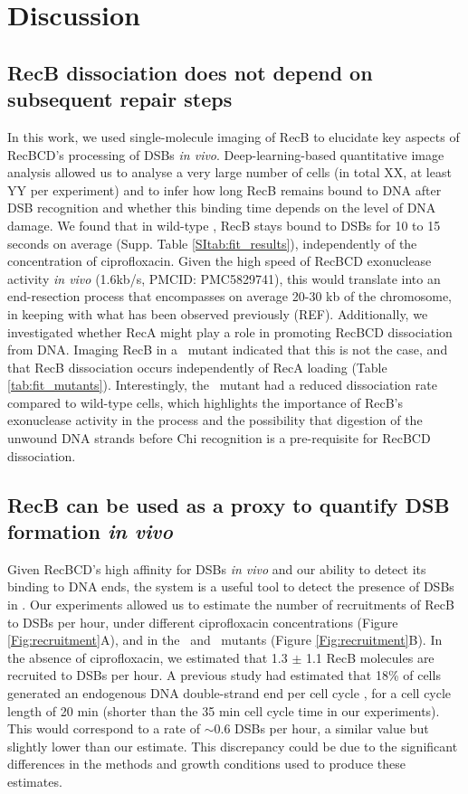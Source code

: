 \section*{Discussion}

\subsection*{RecB dissociation does not depend on subsequent repair steps}
In this work, we used single-molecule imaging of RecB to elucidate key aspects of RecBCD's processing of DSBs \emph{in vivo}. Deep-learning-based quantitative image analysis allowed us to analyse a very large number of cells (in total XX,  at least YY per experiment) and to infer how long RecB remains bound to DNA after DSB recognition and whether this binding time depends on the level of DNA damage. We found that in wild-type \ecoli, RecB stays bound to DSBs for 10 to 15 seconds on average (Supp. Table \ref{SItab:fit_results}), independently of the concentration of ciprofloxacin. Given the high speed of RecBCD exonuclease activity \emph{in vivo} (1.6kb/s, PMCID: PMC5829741), this would translate into an end-resection process that encompasses on average 20-30 kb of the chromosome, in keeping with what has been observed previously (REF). Additionally, we investigated whether RecA might play a role in promoting RecBCD dissociation from DNA. Imaging RecB in a \dreca\ mutant indicated that this is not the case, and that RecB dissociation occurs independently of RecA loading (Table \ref{tab:fit_mutants}). Interestingly, the \geneteneighty\ mutant had a reduced dissociation rate compared to wild-type cells, which highlights the importance of RecB's exonuclease activity in the process and the possibility that digestion of the unwound DNA strands before Chi recognition is a pre-requisite for RecBCD dissociation.

\subsection*{RecB can be used as a proxy to quantify DSB formation \emph{in vivo}}
Given RecBCD's high affinity for DSBs \emph{in vivo} and our ability to detect its binding to DNA ends, the system is a useful tool to detect the presence of DSBs in \ecoli. Our experiments allowed us to estimate the number of recruitments of RecB to DSBs per hour, under different ciprofloxacin concentrations (Figure \ref{Fig:recruitment}A), and in the \dreca\ and \geneteneighty\ mutants (Figure \ref{Fig:recruitment}B). In the absence of ciprofloxacin, we estimated that 1.3 $\pm$ 1.1 RecB molecules are recruited to DSBs per hour. A previous study had estimated that 18\% of cells generated an endogenous DNA double-strand end per cell cycle \cite{Sinha2018}, for a cell cycle length of 20 min (shorter than the 35 min cell cycle time in our experiments). This would correspond to a rate of $\sim$0.6 DSBs per hour, a similar value but slightly lower than our estimate. This discrepancy could be due to the significant differences in the methods and growth conditions used to produce these estimates.

